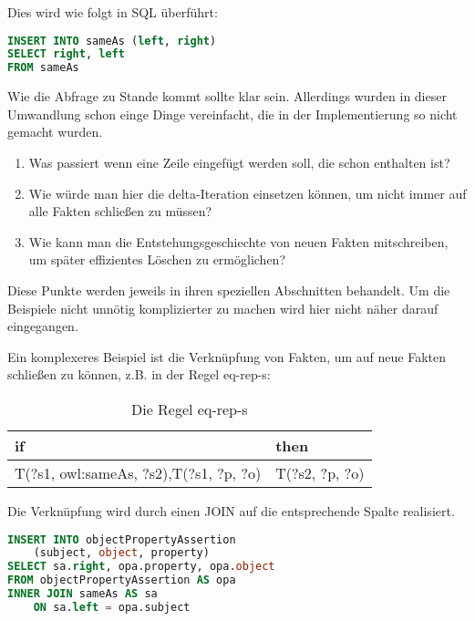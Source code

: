 Dies wird wie folgt in SQL überführt:
\begin{lstlisting}[language=SQL]
INSERT INTO sameAs (left, right)
SELECT right, left
FROM sameAs
\end{lstlisting}

Wie die Abfrage zu Stande kommt sollte klar sein. Allerdings wurden in dieser Umwandlung schon einge Dinge vereinfacht, die in der Implementierung so nicht gemacht wurden.

\begin{enumerate}
  \item Was passiert wenn eine Zeile eingefügt werden soll, die schon enthalten ist?
  \item Wie würde man hier die delta-Iteration einsetzen können, um nicht immer auf alle Fakten schließen zu müssen?
  \item Wie kann man die Entstehungsgeschiechte von neuen Fakten mitschreiben, um später effizientes Löschen zu ermöglichen?
\end{enumerate}

Diese Punkte werden jeweils in ihren speziellen Abschnitten behandelt. Um die Beispiele nicht unnötig komplizierter zu machen wird hier nicht näher darauf eingegangen.

Ein komplexeres Beispiel ist die Verknüpfung von Fakten, um auf neue Fakten schließen zu können, z.B. in der Regel eq-rep-s:
\begin{table}[htb]
\begin{center}
	\begin{tabular}{m{4.5cm}|m{4cm}}
	if & then \\ \hline
	T(?s1, owl:sameAs, ?s2),\newline T(?s1, ?p, ?o) & T(?s2, ?p, ?o)
	\end{tabular}
\end{center}
	\caption{Die Regel eq-rep-s}
	\label{rule-eq-rep-s}
\end{table}

Die Verknüpfung wird durch einen JOIN auf die entsprechende Spalte realisiert.

\begin{lstlisting}[language=SQL]
INSERT INTO objectPropertyAssertion 
	(subject, object, property)
SELECT sa.right, opa.property, opa.object
FROM objectPropertyAssertion AS opa
INNER JOIN sameAs AS sa
	ON sa.left = opa.subject
\end{lstlisting}

